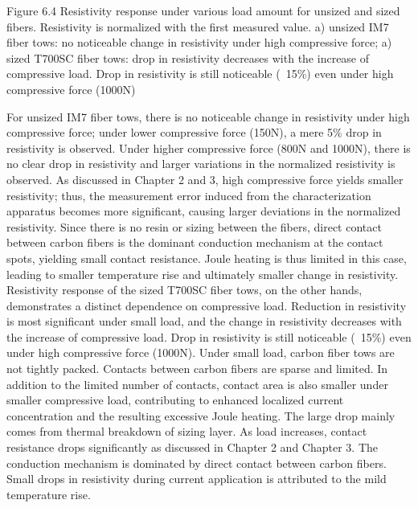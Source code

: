 Figure 6.4 Resistivity response under various load amount for unsized and sized fibers. Resistivity is normalized with the first measured value. a) unsized IM7 fiber tows: no noticeable change in resistivity under high compressive force; a) sized T700SC fiber tows: drop in resistivity decreases with the increase of compressive load. Drop in resistivity is still noticeable (~15\%) even under high compressive force (1000N)

For unsized IM7 fiber tows, there is no noticeable change in resistivity under high compressive force; under lower compressive force (150N), a mere 5\% drop in resistivity is observed.  Under higher compressive force (800N and 1000N), there is no clear drop in resistivity and larger variations in the normalized resistivity is observed. As discussed in Chapter 2 and 3, high compressive force yields smaller resistivity; thus, the measurement error induced from the characterization apparatus becomes more significant, causing larger deviations in the normalized resistivity. Since there is no resin or sizing between the fibers, direct contact between carbon fibers is the dominant conduction mechanism at the contact spots, yielding small contact resistance. Joule heating is thus limited in this case, leading to smaller temperature rise and ultimately smaller change in resistivity. 
Resistivity response of the sized T700SC fiber tows, on the other hands, demonstrates a distinct dependence on compressive load. Reduction in resistivity is most significant under small load, and the change in resistivity decreases with the increase of compressive load. Drop in resistivity is still noticeable (~15\%) even under high compressive force (1000N). Under small load, carbon fiber tows are not tightly packed. Contacts between carbon fibers are sparse and limited. In addition to the limited number of contacts, contact area is also smaller under smaller compressive load, contributing to enhanced localized current concentration and the resulting excessive Joule heating. The large drop mainly comes from thermal breakdown of sizing layer. As load increases, contact resistance drops significantly as discussed in Chapter 2 and Chapter 3. The conduction mechanism is dominated by direct contact between carbon fibers. Small drops in resistivity during current application is attributed to the mild temperature rise.

